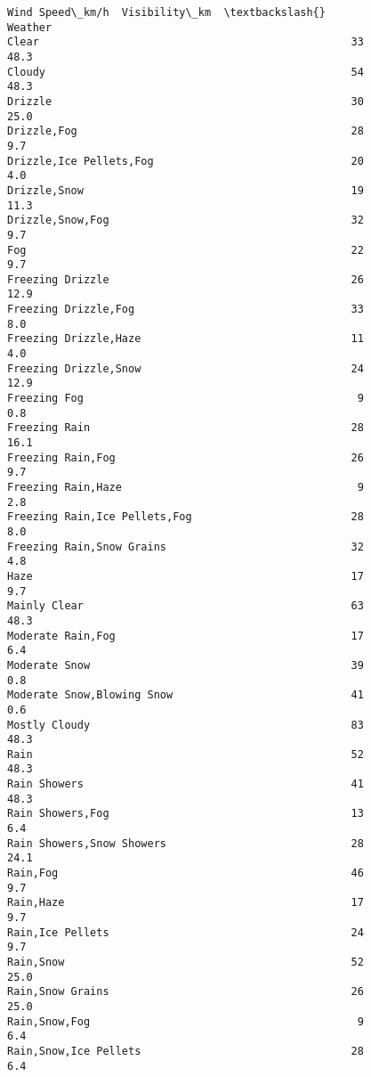 \documentclass[11pt]{article}
\begin{document}
\begin{tcolorbox}[breakable, size=fbox, boxrule=.5pt, pad at break*=1mm, opacityfill=0]
\begin{Verbatim}[commandchars=\\\{\}]
                                         Wind Speed\_km/h  Visibility\_km  \textbackslash{}
Weather
Clear                                                 33           48.3
Cloudy                                                54           48.3
Drizzle                                               30           25.0
Drizzle,Fog                                           28            9.7
Drizzle,Ice Pellets,Fog                               20            4.0
Drizzle,Snow                                          19           11.3
Drizzle,Snow,Fog                                      32            9.7
Fog                                                   22            9.7
Freezing Drizzle                                      26           12.9
Freezing Drizzle,Fog                                  33            8.0
Freezing Drizzle,Haze                                 11            4.0
Freezing Drizzle,Snow                                 24           12.9
Freezing Fog                                           9            0.8
Freezing Rain                                         28           16.1
Freezing Rain,Fog                                     26            9.7
Freezing Rain,Haze                                     9            2.8
Freezing Rain,Ice Pellets,Fog                         28            8.0
Freezing Rain,Snow Grains                             32            4.8
Haze                                                  17            9.7
Mainly Clear                                          63           48.3
Moderate Rain,Fog                                     17            6.4
Moderate Snow                                         39            0.8
Moderate Snow,Blowing Snow                            41            0.6
Mostly Cloudy                                         83           48.3
Rain                                                  52           48.3
Rain Showers                                          41           48.3
Rain Showers,Fog                                      13            6.4
Rain Showers,Snow Showers                             28           24.1
Rain,Fog                                              46            9.7
Rain,Haze                                             17            9.7
Rain,Ice Pellets                                      24            9.7
Rain,Snow                                             52           25.0
Rain,Snow Grains                                      26           25.0
Rain,Snow,Fog                                          9            6.4
Rain,Snow,Ice Pellets                                 28            6.4

\end{Verbatim}
\end{tcolorbox}
\end{document}
